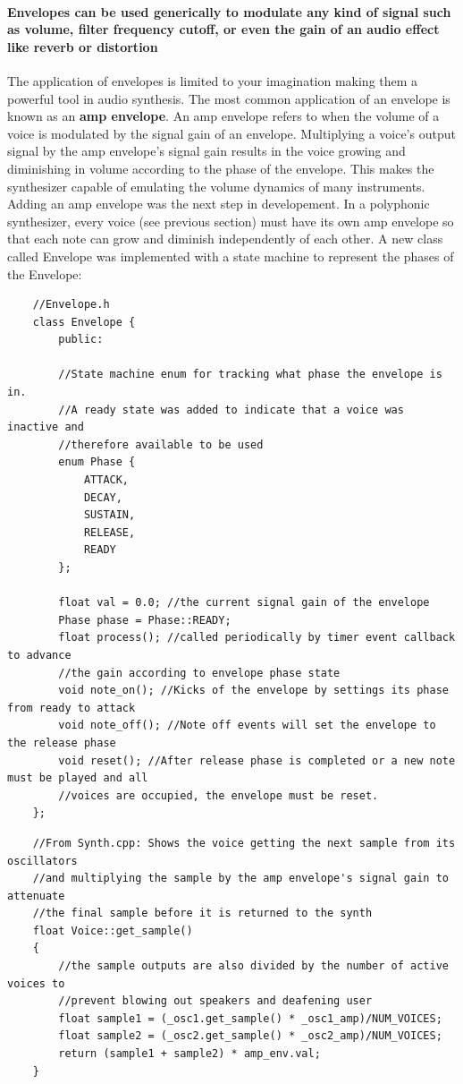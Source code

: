 \documentclass[acmlarge,screen]{acmart}
\begin{document}
	\paragraph{Envelopes can be used generically to modulate any kind of signal such as volume, filter frequency cutoff, or even the gain of an audio effect like reverb or distortion} The application of envelopes is limited to your imagination making them a powerful tool in audio synthesis. The most common application of an envelope is known as an \textbf{amp envelope}. An amp envelope refers to when the volume of a voice is modulated by the signal gain of an envelope. Multiplying a voice's output signal by the amp envelope's signal gain results in the voice growing and diminishing in volume according to the phase of the envelope. This makes the synthesizer capable of emulating the volume dynamics of many instruments. Adding an amp envelope was the next step in developement. In a polyphonic synthesizer, every voice (see previous section) must have its own amp envelope so that each note can grow and diminish independently of each other. A new class called Envelope was implemented with a state machine to represent the phases of the Envelope:
	
	\begin{verbatim}
	//Envelope.h
	class Envelope {
		public:
		
		//State machine enum for tracking what phase the envelope is in.
		//A ready state was added to indicate that a voice was inactive and
		//therefore available to be used
		enum Phase {
			ATTACK,
			DECAY,
			SUSTAIN,
			RELEASE,
			READY 
		};
		
		float val = 0.0; //the current signal gain of the envelope
		Phase phase = Phase::READY;
		float process(); //called periodically by timer event callback to advance
		//the gain according to envelope phase state
		void note_on(); //Kicks of the envelope by settings its phase from ready to attack
		void note_off(); //Note off events will set the envelope to the release phase
		void reset(); //After release phase is completed or a new note must be played and all
		//voices are occupied, the envelope must be reset.
	};
	\end{verbatim}
	
	\begin{verbatim}
	//From Synth.cpp: Shows the voice getting the next sample from its oscillators
	//and multiplying the sample by the amp envelope's signal gain to attenuate
	//the final sample before it is returned to the synth
	float Voice::get_sample()
	{   
		//the sample outputs are also divided by the number of active voices to
		//prevent blowing out speakers and deafening user
		float sample1 = (_osc1.get_sample() * _osc1_amp)/NUM_VOICES;
		float sample2 = (_osc2.get_sample() * _osc2_amp)/NUM_VOICES;
		return (sample1 + sample2) * amp_env.val;
	}
	\end{verbatim}
	
\end{document}

